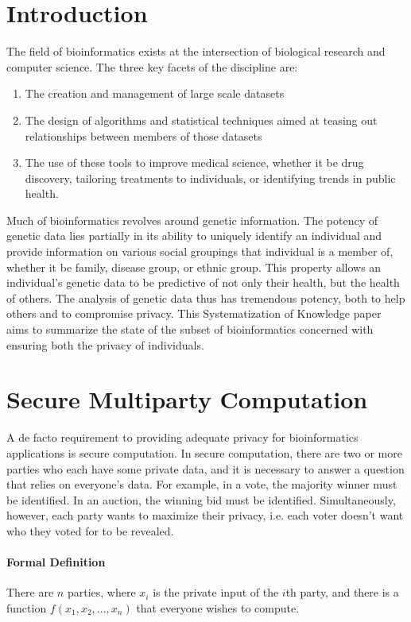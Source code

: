 \section{Introduction}

The field of bioinformatics exists at the intersection of biological research and computer science. The three key facets of the discipline are:

\begin{enumerate}
\item The creation and management of large scale datasets
\item The design of algorithms and statistical techniques aimed at teasing out relationships between members of those datasets
\item The use of these tools to improve medical science, whether it be drug discovery, tailoring treatments to individuals, or identifying trends in public health.
\end{enumerate}

Much of bioinformatics revolves around genetic information. The potency of genetic data lies partially in its ability to uniquely identify an individual and provide information on various social groupings that individual is a member of, whether it be family, disease group, or ethnic group. This property allows an individual's genetic data to be predictive of not only their health, but the health of others. The analysis of genetic data thus has tremendous potency, both to help others and to compromise privacy. This Systematization of Knowledge paper aims to summarize the state of the subset of bioinformatics concerned with ensuring both the privacy of individuals.

\section{Secure Multiparty Computation}

A de facto requirement to providing adequate privacy for bioinformatics applications is secure computation. In secure computation, there are two or more parties who each have some private data, and it is necessary to answer a question that relies on everyone's data. For example, in a vote, the majority winner must be identified. In an auction, the winning bid must be identified. Simultaneously, however, each party wants to maximize their privacy, i.e. each voter doesn't want who they voted for to be revealed.

\paragraph{Formal Definition}
There are $n$ parties, where $x_i$ is the private input of the $i$th party, and there is a function $f(x_1, x_2, ..., x_n)$ that everyone wishes to compute. 

